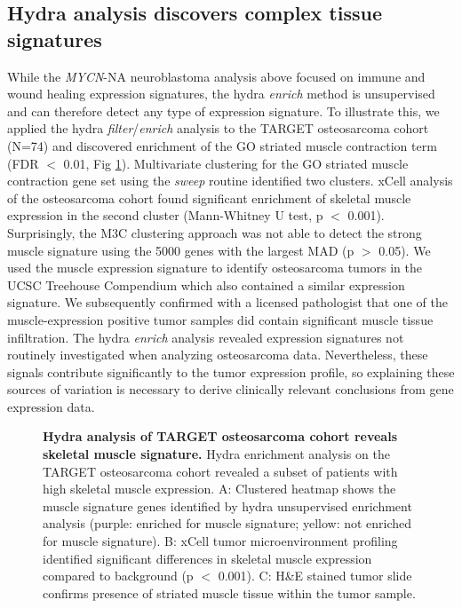 \documentclass[10pt,letterpaper]{article}
\begin{document}
\subsection*{Hydra analysis discovers complex tissue signatures}
While the \textit{MYCN}-NA neuroblastoma analysis above focused on immune and wound healing expression signatures, the hydra \textit{enrich} method is unsupervised and can therefore detect any type of expression signature. To illustrate this, we applied the hydra \textit{filter}/\textit{enrich} analysis to the TARGET osteosarcoma cohort (N=74) and discovered enrichment of the GO striated muscle contraction term (FDR $<$ 0.01, Fig \ref{muscle}). Multivariate clustering for the GO striated muscle contraction gene set using the \textit{sweep} routine identified two clusters. xCell analysis of the osteosarcoma cohort found significant enrichment of skeletal muscle expression in the second cluster (Mann-Whitney U test, p $<$ 0.001). Surprisingly, the M3C clustering approach was not able to detect the strong muscle signature using the 5000 genes with the largest MAD (p $>$ 0.05). We used the muscle expression signature to identify osteosarcoma tumors in the UCSC Treehouse Compendium which also contained a similar expression signature. We subsequently confirmed with a licensed pathologist that one of the muscle-expression positive tumor samples did contain significant muscle tissue infiltration. The hydra \textit{enrich} analysis revealed expression signatures not routinely investigated when analyzing osteosarcoma data. Nevertheless, these signals contribute significantly to the tumor expression profile, so explaining these sources of variation is necessary to derive clinically relevant conclusions from gene expression data.

%
%
\begin{figure}[!h]
	\caption{{\bf Hydra analysis of TARGET osteosarcoma cohort reveals skeletal muscle signature.}
		 Hydra enrichment analysis on the TARGET osteosarcoma cohort revealed a subset of patients with high skeletal muscle expression. A: Clustered heatmap shows the muscle signature genes identified by hydra unsupervised enrichment analysis (purple: enriched for muscle signature; yellow: not enriched for muscle signature). B: xCell tumor microenvironment profiling identified significant differences in skeletal muscle expression compared to background (p $<$ 0.001). C: H\&E stained tumor slide confirms presence of striated muscle tissue within the tumor sample.}
	\label{muscle}
\end{figure}
\end{document}
